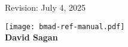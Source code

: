 
\thispagestyle{empty}

\begin{flushright}
\large
  Revision: July 4, 2025 \\
\end{flushright}


\vfill

{
\begin{center}
\texttt{[image: bmad-ref-manual.pdf]} \\
\vskip 0.3in
\huge\bf David Sagan
\end{center}
}

\vfill
\break
